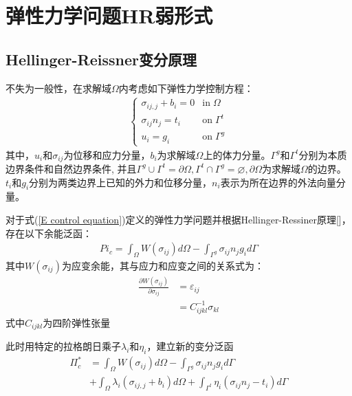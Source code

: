\chapter{弹性力学问题HR弱形式}
\section{Hellinger-Reissner变分原理}
不失为一般性，在求解域$\Omega$内考虑如下弹性力学控制方程：
\begin{equation}\label{E control equation}
\begin{split}
\begin{cases}
    \sigma_{ij,j}+b_i=0&\text{in}\;\Omega\\
    \sigma_{ij}n_j=t_i&\text{on}\;\Gamma^t\\
    u_i=g_i&\text{on}\;\Gamma^g
\end{cases}
\end{split}
\end{equation}
其中，$u_i$和$\sigma_{ij}$为位移和应力分量，$b_i$为求解域$\Omega$上的体力分量。$\Gamma^g$和$\Gamma^t$分别为本质边界条件和自然边界条件,
并且$\Gamma^g\cup\Gamma^t=\partial\Omega,\Gamma^t\cap\Gamma^g=\varnothing,\partial\Omega$为求解域$\Omega$的边界。$t_i$和$g_i$分别为两类边界上已知的外力和位移分量，$n_i$表示为所在边界的外法向量分量。\par
对于式(\ref{E control equation})定义的弹性力学问题并根据Hellinger-Ressiner原理[]，存在以下余能泛函：
\begin{equation}
\begin{split}
    Pi_c=\int_{\Omega}W(\sigma_{ij})d\Omega-\int_{\Gamma^g}\sigma_{ij}n_jg_id\Gamma
\end{split}
\end{equation}
其中$W(\sigma_{ij})$为应变余能，其与应力和应变之间的关系式为：
\begin{equation}
\begin{split}
\frac{\partial W(\sigma_{ij})}{\partial\sigma_{ij}}&=\varepsilon_{ij}\\
&=C^{-1}_{ijkl}\sigma_{kl}
\end{split}
\end{equation}
式中$C_{ijkl}$为四阶弹性张量\par
此时用特定的拉格朗日乘子$\lambda_i$和$\eta_i$，建立新的变分泛函
\begin{equation}\label{functional1}
\begin{split}
    \Pi_c^*&=\int_{\Omega}W(\sigma_{ij})d\Omega-\int_{\Gamma^g}\sigma_{ij}n_jg_id\Gamma\\
    &+\int_{\Omega}\lambda_i(\sigma_{ij,j}+b_i)d\Omega+\int_{\Gamma^t}\eta_i(\sigma_{ij}n_j-t_i)d\Gamma
\end{split}
\end{equation}
